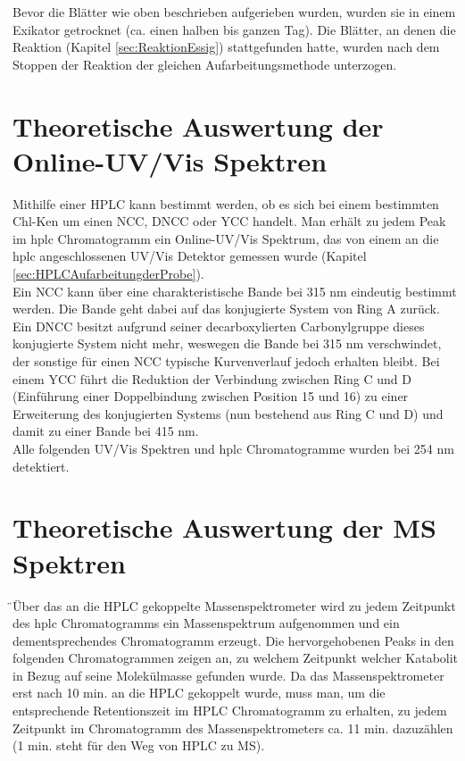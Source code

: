 Bevor die Blätter wie oben beschrieben aufgerieben wurden, wurden sie in einem Exikator getrocknet (ca. einen halben bis ganzen Tag). Die Blätter, an denen die Reaktion (Kapitel \ref{sec:ReaktionEssig}) stattgefunden hatte, wurden nach dem Stoppen der Reaktion der gleichen Aufarbeitungsmethode unterzogen. 

\section{Theoretische Auswertung der Online-UV/Vis Spektren} \label{sec:IdentifikationUVVis}

Mithilfe einer HPLC kann bestimmt werden, ob es sich bei einem bestimmten \gls{Chl-K}en um einen \gls{NCC}, \gls{DNCC} oder \gls{YCC} handelt. Man erhält zu jedem Peak im \gls{hplc} Chromatogramm ein Online-UV/Vis Spektrum, das von einem an die \gls{hplc} angeschlossenen UV/Vis Detektor gemessen wurde (Kapitel \ref{sec:HPLCAufarbeitungderProbe}). \\

Ein \gls{NCC} kann über eine charakteristische Bande bei 315 nm eindeutig bestimmt werden. Die Bande geht dabei auf das konjugierte System von Ring A zurück. Ein \gls{DNCC} besitzt aufgrund seiner decarboxylierten Carbonylgruppe dieses konjugierte System nicht mehr, weswegen die Bande bei 315 nm verschwindet, der sonstige für einen \gls{NCC} typische Kurvenverlauf jedoch erhalten bleibt. Bei einem \gls{YCC} führt die Reduktion der Verbindung zwischen Ring C und D (Einführung einer Doppelbindung zwischen Position 15 und 16) zu einer Erweiterung des konjugierten Systems (nun bestehend aus Ring C und D) und damit zu einer Bande bei 415 nm. \\

Alle folgenden UV/Vis Spektren und \gls{hplc} Chromatogramme wurden bei 254 nm detektiert.

\section{Theoretische Auswertung der MS Spektren} \label{sec:IdentifikationMS}

̈Über das an die HPLC gekoppelte Massenspektrometer wird zu jedem Zeitpunkt des \gls{hplc} Chromatogramms ein Massenspektrum aufgenommen und ein dementsprechendes Chromatogramm erzeugt. Die hervorgehobenen Peaks in den folgenden Chromatogrammen zeigen an, zu welchem Zeitpunkt welcher Katabolit in Bezug auf seine Molekülmasse gefunden wurde. Da das Massenspektrometer erst nach 10 min. an die HPLC gekoppelt wurde, muss man, um die entsprechende Retentionszeit im HPLC Chromatogramm zu erhalten, zu jedem Zeitpunkt im Chromatogramm des Massenspektrometers ca. 11 min. dazuzählen (1 min. steht für den Weg von HPLC zu MS).  \\

